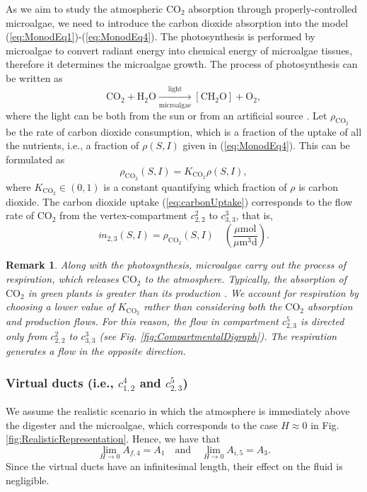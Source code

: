 \documentclass[lettersize,journal]{IEEEtran}
\newtheorem{remark}{Remark}
\begin{document}
As we aim to study the atmospheric $\text{CO}_2$ absorption through properly-controlled microalgae, we need to introduce the carbon dioxide absorption into the model (\ref{eq:MonodEq1})-(\ref{eq:MonodEq4}). The photosynthesis is performed by microalgae to convert radiant energy into chemical energy of microalgae tissues, therefore it determines the microalgae growth. The process of photosynthesis can be written as \cite{hall1999photosynthesis}
\begin{equation}
\text{CO}_2 + \text{H}_2\text{O} \xrightarrow[\text{microalgae}]{\text{light}} [\text{CH}_2\text{O}] + \text{O}_2, 
\end{equation}
where the light can be both from the sun or from an artificial source \cite{darko2014photosynthesis}. Let $\rho_{\text{CO}_2}$ be the rate of carbon dioxide consumption, which is a fraction of the uptake of all the nutrients, i.e., a fraction of $\rho(S, I)$ given in (\ref{eq:MonodEq4}). This can be formulated as 
\begin{equation}\label{eq:carbonUptake}
\rho_{\text{CO}_2}(S, I) = K_{\text{CO}_2} \rho(S, I),  
\end{equation}
where $K_{\text{CO}_2} \in (0, 1)$ is a constant quantifying which fraction of $\rho$ is carbon dioxide. The carbon dioxide uptake (\ref{eq:carbonUptake}) corresponds to the flow rate of $\text{CO}_2$ from the vertex-compartment $c^2_{2,2}$ to $c^3_{3,3}$, that is,
\begin{equation}
\dot{m}_{2,3}(S, I) = \rho_{\text{CO}_2}(S, I) \quad \left(\frac{\mu\text{mol}}{\mu\text{m}^3 \text{d}}\right).  
\end{equation}   
\begin{remark}
Along with the photosynthesis, microalgae carry out the process of respiration, which releases $\text{CO}_2$ to the atmosphere. Typically, the absorption of $\text{CO}_2$ in green plants is greater than its production \cite{solimeno2015new,hall1999photosynthesis}. We account for respiration by choosing a lower value of $K_{\text{CO}_2}$ rather than considering both the $\text{CO}_2$ absorption and production flows. For this reason, the flow in compartment $c^5_{2,3}$ is directed only from $c^2_{2,2}$ to $c^3_{3,3}$ (see Fig. \ref{fig:CompartmentalDigraph}). The respiration generates a flow in the opposite direction.       
\end{remark}
       



\subsubsection{Virtual ducts (i.e., $c^4_{1,2}$ and $c^5_{2,3}$)} 
We assume the realistic scenario in which the atmosphere is immediately above the digester and the microalgae, which corresponds to the case $H \approx 0$ in Fig. \ref{fig:RealisticRepresentation}. Hence, we have that
\begin{equation}
\lim_{H \to 0} A_{f,4} = A_1 \quad \text{and} \quad \lim_{H \to 0} A_{i,5} = A_3.  
\end{equation}
Since the virtual ducts have an infinitesimal length, their effect on the fluid is negligible.
\end{document}
